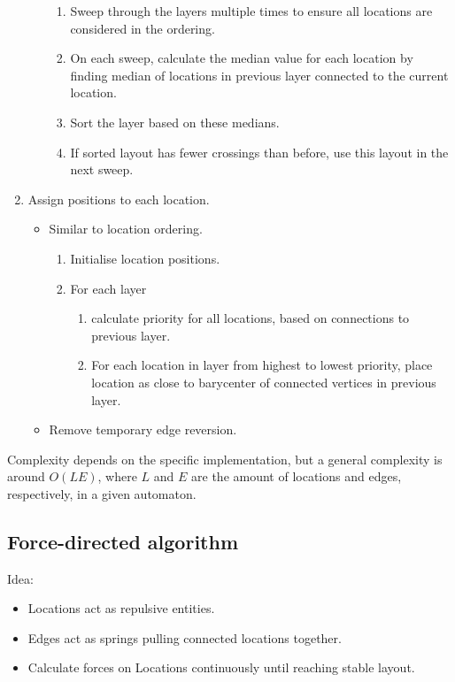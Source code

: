 \begin{enumerate}
\begin{itemize}
                    \begin{enumerate}
                        \item Sweep through the layers multiple times to ensure all locations are considered in the ordering.
                        \item On each sweep, calculate the median value for each location by finding median of locations in previous layer connected to the current location.
                        \item Sort the layer based on these medians.
                        \item If sorted layout has fewer crossings than before, use this layout in the next sweep.
                    \end{enumerate}
          \end{itemize}
    \item Assign positions to each location.
          \begin{itemize}
              \item Similar to location ordering.
                    \begin{enumerate}
                        \item Initialise location positions.
                        \item For each layer
                              \begin{enumerate}
                                  \item calculate priority for all locations, based on connections to previous layer.
                                  \item For each location in layer from highest to lowest priority, place location as close to barycenter of connected vertices in previous layer.
                              \end{enumerate}
                    \end{enumerate}
              \item Remove temporary edge reversion.
          \end{itemize}
\end{enumerate}
\noindent
Complexity depends on the specific implementation, but a general complexity is around $O(LE)$, where $L$ and $E$ are the amount of locations and edges, respectively, in a given automaton.

\subsection{Force-directed algorithm}

Idea:
\begin{itemize}
    \item Locations act as repulsive entities.
    \item Edges act as springs pulling connected locations together.
    \item Calculate forces on Locations continuously until reaching stable layout.
\end{itemize}